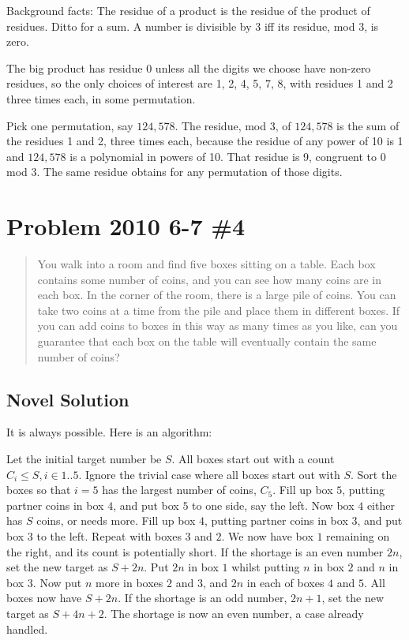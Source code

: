 \documentclass{article}
\begin{document}
Background facts: The residue of a product is the residue of the product of residues. Ditto for a sum. A number is divisible by 3 iff its residue, mod 3, is zero.

The big product has residue 0 unless all the digits we choose have non-zero residues, so the only choices of interest are 1, 2, 4, 5, 7, 8, with residues 1 and 2 three times each, in some permutation. 

Pick one permutation, say $124,578$. The residue, mod 3, of $124,578$ is the sum of the residues 1 and 2, three times each, because the residue of any power of 10 is 1 and $124,578$ is a polynomial in powers of 10. That residue is 9, congruent to 0 mod 3. The same residue obtains for any permutation of those digits.

\section{Problem 2010 6-7 \#4}

\begin{framed}
\begin{quote}
    You walk into a room and find five boxes sitting on a table. Each box 
    contains some number of coins, and you can see how many coins are in 
    each box. In the corner of the room, there is a large pile of coins. You 
    can take two coins at a time from the pile and place them in different
    boxes. If you can add coins to boxes in this way as many times as you 
    like, can you guarantee that each box on the table will eventually 
    contain the same number of coins?
\end{quote}
\end{framed}

\subsection{Novel Solution}

It is always possible. Here is an algorithm:

Let the initial target number be $S$. All boxes start out with a count $C_i\le{}S,i\in{1..5}$. Ignore the trivial case where all boxes start out with $S$. Sort the boxes so that $i=5$ has the largest number of coins, $C_5$. Fill up box $5$, putting partner coins in box $4$, and put box $5$ to one side, say the left. Now box $4$ either has $S$ coins, or needs more. Fill up box $4$, putting partner coins in box $3$, and put box $3$ to the left. Repeat with boxes $3$ and $2$. We now have box $1$ remaining on the right, and its count is potentially short. If the shortage is an even number $2n$, set the new target as $S+2n$. Put $2n$ in box $1$ whilst putting $n$ in box $2$ and $n$ in box $3$. Now put $n$ more in boxes $2$ and $3$, and $2n$ in each of boxes $4$ and $5$. All boxes now have $S+2n$. If the shortage is an odd number, $2n+1$, set the new target as $S+4n+2$. The shortage is now an even number, a case already handled.
\end{document}
